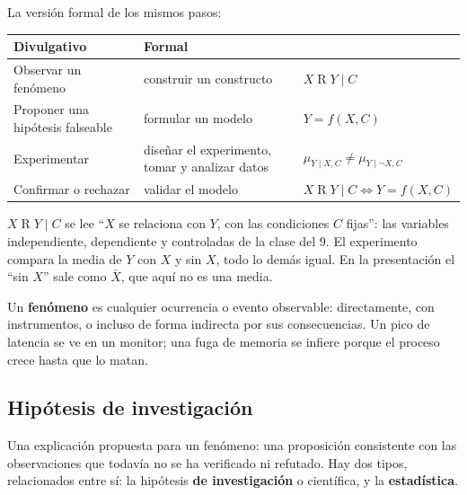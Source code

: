 \documentclass[11pt,letterpaper]{article}
\begin{document}
La versión formal de los mismos pasos:

\begin{center}
\small
\begin{tabular}{>{\raggedright\arraybackslash}p{4.2cm}%
                >{\raggedright\arraybackslash}p{4.6cm}l}
    \toprule
    \textbf{Divulgativo} & \textbf{Formal} & \\
    \midrule
    Observar un fenómeno & construir un constructo
                         & $X \mathrel{R} Y \mid C$ \\
    \addlinespace
    Proponer una hipótesis falseable & formular un modelo
                                     & $Y = f(X, C)$ \\
    \addlinespace
    Experimentar & diseñar el experimento, tomar y analizar datos
                 & $\mu_{Y \mid X, C} \neq \mu_{Y \mid \neg X, C}$ \\
    \addlinespace
    Confirmar o rechazar & validar el modelo
                         & $X \mathrel{R} Y \mid C \iff Y = f(X, C)$ \\
    \bottomrule
\end{tabular}
\end{center}

$X \mathrel{R} Y \mid C$ se lee ``$X$ se relaciona con $Y$, con las
condiciones $C$ fijas'': las variables independiente, dependiente y
controladas de la clase del $9$. El experimento compara la media de
$Y$ con $X$ y sin $X$, todo lo demás igual. En la presentación el
``sin $X$'' sale como $\bar{X}$, que aquí no es una media.

Un \textbf{fenómeno} es cualquier ocurrencia o evento observable:
directamente, con instrumentos, o incluso de forma indirecta por sus
consecuencias. Un pico de latencia se ve en un monitor; una fuga de
memoria se infiere porque el proceso crece hasta que lo matan.


\subsection*{Hipótesis de investigación}

\begin{definicion}[Hipótesis]
    Una explicación propuesta para un fenómeno: una proposición
    consistente con las observaciones que todavía no se ha verificado
    ni refutado. Hay dos tipos, relacionados entre sí: la hipótesis
    \textbf{de investigación} o científica, y la \textbf{estadística}.
\end{definicion}
\end{document}
